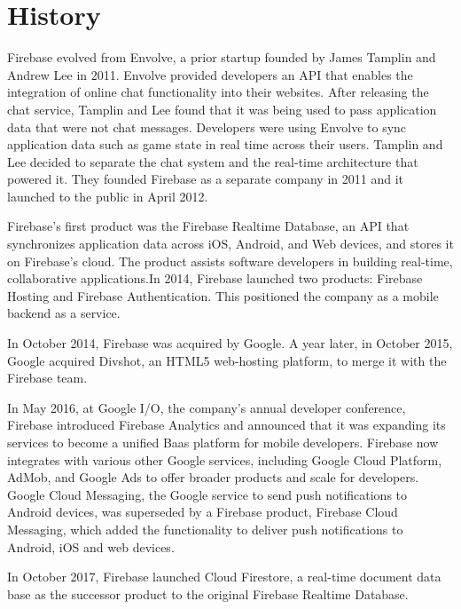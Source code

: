 \documentclass[12pt,a4paper]{report}
\begin{document}
\section{{\fontsize{16}{0}\selectfont History}}
{\fontsize{14}{0}\selectfont
\noindent
Firebase evolved from Envolve, a prior startup founded by James Tamplin and Andrew Lee in 2011. Envolve provided developers an \ac{API} that enables the integration of online chat functionality into their websites. After releasing the chat service, Tamplin and Lee found that it was being used to pass application data that were not chat messages. Developers were using Envolve to sync application data such as game state in real time across their users. Tamplin and Lee decided to separate the chat system and the real-time architecture that powered it. They founded Firebase as a separate company in 2011 and it launched to the public in April 2012.

\hspace{1cm}Firebase's first product was the Firebase Realtime Database, an \ac{API} that synchronizes application data across \ac{iOS}, Android, and Web devices, and stores it on Firebase's cloud. The product assists software developers in building real-time, collaborative applications.In 2014, Firebase launched two products: Firebase Hosting and Firebase Authentication. This positioned the company as a mobile backend as a service.

\hspace{1cm}In October 2014, Firebase was acquired by Google. A year later, in October 2015, Google acquired Divshot, an HTML5 web-hosting platform, to merge it with the Firebase team.

\hspace{1cm}In May 2016, at Google I/O, the company's annual developer conference, Firebase introduced Firebase Analytics and announced that it was expanding its services to become a unified \ac{Baas} platform for mobile developers. Firebase now integrates with various other Google services, including Google Cloud Platform, AdMob, and Google Ads to offer broader products and scale for developers. Google Cloud Messaging, the Google service to send push notifications to Android devices, was superseded by a Firebase product, Firebase Cloud Messaging, which added the functionality to deliver push notifications to Android, \ac{iOS} and web devices.

\hspace{1cm}In October 2017, Firebase launched Cloud Firestore, a real-time document data base
as the successor product to the original Firebase Realtime Database.}
\end{document}

